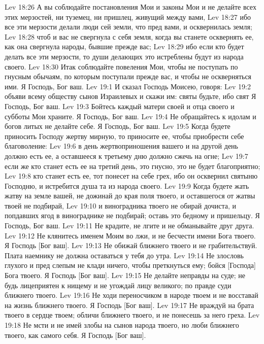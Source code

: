 \vs Lev 18:26 А вы соблюдайте постановления Мои и законы Мои и не делайте всех этих мерзостей, ни туземец, ни пришлец, живущий между вами,
\vs Lev 18:27 ибо все эти мерзости делали люди сей земли, что пред вами, и осквернилась земля;
\vs Lev 18:28 чтоб и вас не свергнула с себя земля, когда вы станете осквернять ее, как она свергнула народы, бывшие прежде вас;
\vs Lev 18:29 ибо если кто будет делать все эти мерзости, то души делающих это истреблены будут из народа своего.
\vs Lev 18:30 Итак соблюдайте повеления Мои, чтобы не поступать по гнусным обычаям, по которым поступали прежде вас, и чтобы не оскверняться ими. Я Господь, Бог ваш.
\vs Lev 19:1 И сказал Господь Моисею, говоря:
\vs Lev 19:2 объяви всему обществу сынов Израилевых и скажи им: святы будьте, ибо свят Я Господь, Бог ваш.
\vs Lev 19:3 Бойтесь каждый матери своей и отца своего и субботы Мои храните. Я Господь, Бог ваш.
\vs Lev 19:4 Не обращайтесь к идолам и богов литых не делайте себе. Я Господь, Бог ваш.
\vs Lev 19:5 Когда будете приносить Господу жертву мирную, то приносите ее, чтобы приобрести себе благоволение:
\vs Lev 19:6 в день жертвоприношения вашего и на другой день должно есть ее, а оставшееся к третьему дню должно сжечь на огне;
\vs Lev 19:7 если же кто станет есть ее на третий день, это гнусно, это не будет благоприятно;
\vs Lev 19:8 кто станет есть ее, тот понесет на себе грех, ибо он осквернил святыню Господню, и истребится душа та из народа своего.
\vs Lev 19:9 Когда будете жать жатву на земле вашей, не дожинай до края поля твоего, и оставшегося от жатвы твоей не подбирай,
\vs Lev 19:10 и виноградника твоего не обирай дочиста, и попдавших ягод в винограднике не подбирай; оставь это бедному и пришельцу. Я Господь, Бог ваш.
\vs Lev 19:11 Не крадите, не лгите и не обманывайте друг друга.
\vs Lev 19:12 Не клянитесь именем Моим во лжи, и не бесчести имени Бога твоего. Я Господь [Бог ваш].
\vs Lev 19:13 Не обижай ближнего твоего и не грабительствуй. Плата наемнику не должна оставаться у тебя до утра.
\vs Lev 19:14 Не злословь глухого и пред слепым не клади ничего, чтобы преткнуться ему; бойся [Господа] Бога твоего. Я Господь [Бог ваш].
\vs Lev 19:15 Не делайте неправды на суде; не будь лицеприятен к нищему и не угождай лицу великого; по правде суди ближнего твоего.
\vs Lev 19:16 Не ходи переносчиком в народе твоем и не восставай на жизнь ближнего твоего. Я Господь [Бог ваш].
\vs Lev 19:17 Не враждуй на брата твоего в сердце твоем; обличи ближнего твоего, и не понесешь за него греха.
\vs Lev 19:18 Не мсти и не имей злобы на сынов народа твоего, но люби ближнего твоего, как самого себя. Я Господь [Бог ваш].

